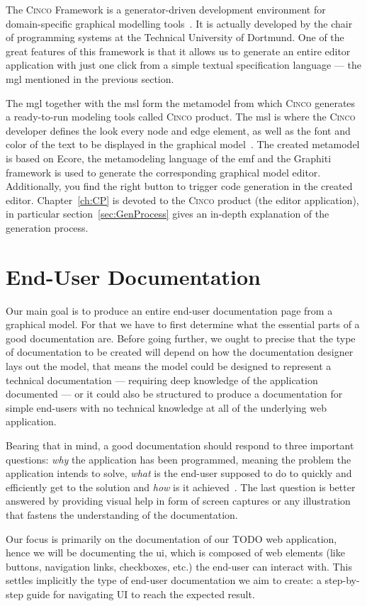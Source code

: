 The \textsc{Cinco} Framework is a generator-driven development environment for domain-specific graphical modelling tools~\cite{Cinco}. It is actually developed by the chair of programming systems at the Technical University of Dortmund. One of the great features of this framework is that it allows us to generate an entire editor application with just one click from a simple textual specification language --- the \acrfull{mgl} mentioned in the previous section. 

The \acrshort{mgl} together with the \acrshort{msl} form the metamodel from which \textsc{Cinco} generates a ready-to-run modeling tools called \textsc{Cinco} product. The \acrshort{msl} is where the \textsc{Cinco} developer defines the look every node and edge element, as well as the font and color of the text to be displayed in the graphical model~\cite{naujokat-diss}. The created metamodel is based on Ecore, the metamodeling language of the \acrfull{emf} and the Graphiti framework is used to generate the corresponding graphical model editor. Additionally, you find the right button to trigger code generation in the created editor. Chapter~\ref{ch:CP} is devoted to the \textsc{Cinco} product (the editor application), in particular section~\ref{sec:GenProcess} gives an in-depth explanation of the generation process.



\section{End-User Documentation}\label{sec:endUserDoc}

Our main goal is to produce an entire end-user documentation page from a graphical model. For that we have to first determine what the essential parts of a good documentation are. Before going further, we ought to precise that the type of documentation to be created will depend on how the documentation designer lays out the model, that means the model could be designed to represent a technical documentation --- requiring deep knowledge of the application documented --- or it could also be structured to produce a documentation for simple end-users with no technical knowledge at all of the underlying web application.

Bearing that in mind, a good documentation should respond to three important questions: \textit{why} the application has been programmed, meaning the problem the application intends to solve, \textit{what} is the end-user supposed to do to quickly and efficiently get to the solution and \textit{how} is it achieved~\cite{ISO-IEC-IEEE}. The last question is better answered by providing visual help in form of screen captures or any illustration that fastens the understanding of the documentation.

Our focus is primarily on the documentation of our TODO web application, hence we will be documenting the \acrfull{ui}, which is composed of web elements (like buttons, navigation links, checkboxes, etc.) the end-user can interact with. This settles implicitly the type of end-user documentation we aim to create: a step-by-step guide for navigating UI to reach the expected result. 
